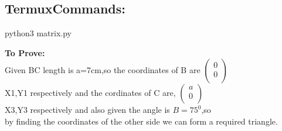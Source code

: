 \documentclass[10pt,a4paper]{report}
\begin{document}
\begin{multicols}{2}
   \section{TermuxCommands: } 
               \centering python3 matrix.py

\raggedright \textbf{To Prove:}\\
   Given BC length is a=7cm,so the coordinates of B are 
 $\begin{pmatrix}
  0\\
  0 \\
 \end{pmatrix}$%
 \\ X1,Y1 respectively and the cordinates of C are,
 $\begin{pmatrix}
  a\\
  0 \\
 \end{pmatrix}$%
 \\ X3,Y3 respectively and also given the angle is $B=75^0$,so \\ by finding the coordinates of the other side we can form a required triangle. \\


\end{multicols}
\end{document}
